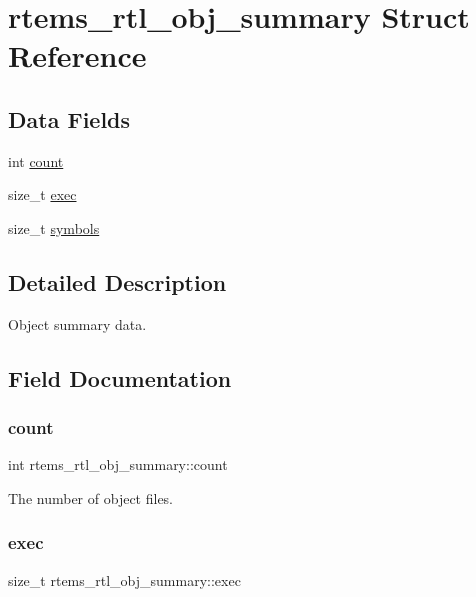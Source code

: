 \hypertarget{structrtems__rtl__obj__summary}{}\section{rtems\+\_\+rtl\+\_\+obj\+\_\+summary Struct Reference}
\label{structrtems__rtl__obj__summary}
\subsection*{Data Fields}
\begin{DoxyCompactItemize}
\item 
int \mbox{\hyperlink{structrtems__rtl__obj__summary_a330c6c40f5964b94b3fb852168102820}{count}}
\item 
size\+\_\+t \mbox{\hyperlink{structrtems__rtl__obj__summary_ac56fbe26bd26e149034cefbda77832ab}{exec}}
\item 
size\+\_\+t \mbox{\hyperlink{structrtems__rtl__obj__summary_a763b0a7c9c53826d100a83db231aa665}{symbols}}
\end{DoxyCompactItemize}


\subsection{Detailed Description}
Object summary data. 

\subsection{Field Documentation}
\mbox{\label{structrtems__rtl__obj__summary_a330c6c40f5964b94b3fb852168102820}} 
\subsubsection{\texorpdfstring{count}{count}}
{\footnotesize\ttfamily int rtems\+\_\+rtl\+\_\+obj\+\_\+summary\+::count}

The number of object files. \mbox{\label{structrtems__rtl__obj__summary_ac56fbe26bd26e149034cefbda77832ab}} 
\subsubsection{\texorpdfstring{exec}{exec}}
{\footnotesize\ttfamily size\+\_\+t rtems\+\_\+rtl\+\_\+obj\+\_\+summary\+::exec}

